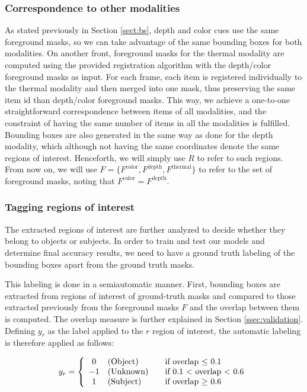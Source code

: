 \documentclass[10pt,twocolumn,letterpaper]{article}
\begin{document}
\subsubsection{Correspondence to other modalities} 
\label{sssec:correspondence}
As stated previously in Section \ref{sect:bs}, depth and color cues use the same foreground masks, so we can take advantage of the same bounding boxes for both modalities. On another front, foreground masks for the thermal modality are computed using the provided registration algorithm with the depth/color foreground masks as input. For each frame, each item is registered individually to the thermal modality and then merged into one mask, thus preserving the same item id than depth/color foreground masks. This way, we achieve a one-to-one straightforward correspondence between items of all modalities, and the constraint of having the same number of items in all the modalities is fulfilled. Bounding boxes are also generated in the same way as done for the depth modality, which although not having the same coordinates denote the same regions of interest. Henceforth, we will simply use $R$ to refer to such regions. From now on, we will use $F = \{F^\mathrm{color}, F^\mathrm{depth}, F^\mathrm{thermal}\}$ to refer to the set of foreground masks, noting that $F^\mathrm{color} = F^\mathrm{depth}$.

\subsubsection{Tagging regions of interest}
\label{sssec:tagging}
The extracted regions of interest are further analyzed to decide whether they belong to objects or subjects. In order to train and test our models and determine final accuracy results, we need to have a ground truth labeling of the bounding boxes apart from the ground truth masks. 

This labeling is done in a semiautomatic manner. First, bounding boxes are extracted from regions of interest of ground-truth masks and compared to those extracted previously from the foreground masks $F$ and the overlap between them is computed. The overlap measure is further explained in Section \ref{ssec:validation}. Defining $y_r$ as the label applied to the $r$ region of interest, the automatic labeling is therefore applied as follows: 

\begin{gather}
\text{$y_r$} = \left\{ 
  \begin{array}{c l l}
    0  & \text{(Object)} & \quad \text{if overlap $\leq$ 0.1 }\\
    -1 & \text{(Unknown)} & \quad \text{if 0.1 $<$ overlap $<$ 0.6}\\
    1 & \text{(Subject)} & \quad \text{if overlap $\geq$ 0.6 }
  \end{array} \right.
 \end{gather}
\end{document}
